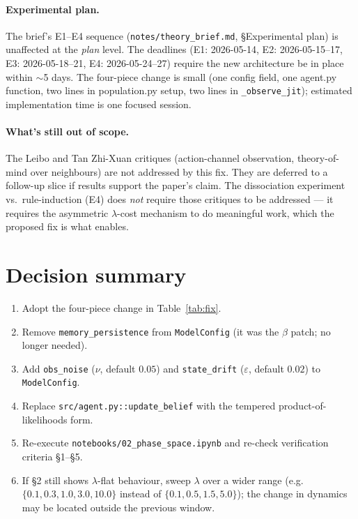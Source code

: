 \documentclass[11pt,a4paper]{article}
\newcommand{\code}[1]{\texttt{\small #1}}
\begin{document}
\paragraph{Experimental plan.} The brief's E1--E4 sequence
(\code{notes/theory\_brief.md}, \S Experimental plan) is unaffected at the
\emph{plan} level. The deadlines (E1: 2026-05-14, E2: 2026-05-15--17, E3:
2026-05-18--21, E4: 2026-05-24--27) require the new architecture be in place
within $\sim$5 days. The four-piece change is small (one config field, one
agent.py function, two lines in population.py setup, two lines in
\code{\_observe\_jit}); estimated implementation time is one focused
session.

\paragraph{What's still out of scope.} The Leibo and Tan Zhi-Xuan critiques
(action-channel observation, theory-of-mind over neighbours) are not
addressed by this fix. They are deferred to a follow-up slice if results
support the paper's claim. The dissociation experiment vs.\ rule-induction
(E4) does \emph{not} require those critiques to be addressed --- it requires
the asymmetric $\lambda$-cost mechanism to do meaningful work, which the
proposed fix is what enables.

\section{Decision summary}
\label{sec:decision}

\begin{enumerate}[topsep=2pt,itemsep=2pt]
\item Adopt the four-piece change in Table~\ref{tab:fix}.
\item Remove \code{memory\_persistence} from \code{ModelConfig} (it was the
  $\beta$ patch; no longer needed).
\item Add \code{obs\_noise} ($\nu$, default $0.05$) and \code{state\_drift}
  ($\varepsilon$, default $0.02$) to \code{ModelConfig}.
\item Replace \code{src/agent.py::update\_belief} with the tempered
  product-of-likelihoods form.
\item Re-execute \code{notebooks/02\_phase\_space.ipynb} and re-check
  verification criteria \S1--\S5.
\item If \S2 still shows $\lambda$-flat behaviour, sweep $\lambda$ over a
  wider range (e.g.\ $\{0.1, 0.3, 1.0, 3.0, 10.0\}$ instead of $\{0.1, 0.5,
  1.5, 5.0\}$); the change in dynamics may be located outside the previous
  window.
\end{enumerate}
\end{document}
